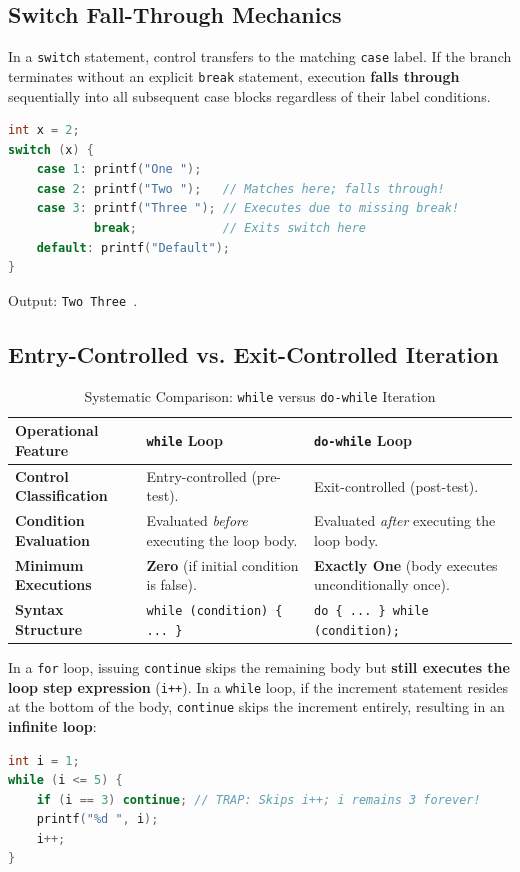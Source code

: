 \subsection{Switch Fall-Through Mechanics}
In a \texttt{switch} statement, control transfers to the matching \texttt{case} label. If the branch terminates without an explicit \texttt{break} statement, execution \textbf{falls through} sequentially into all subsequent case blocks regardless of their label conditions.

\begin{lstlisting}[language=C]
int x = 2;
switch (x) {
    case 1: printf("One ");
    case 2: printf("Two ");   // Matches here; falls through!
    case 3: printf("Three "); // Executes due to missing break!
            break;            // Exits switch here
    default: printf("Default");
}
\end{lstlisting}
Output: \texttt{Two Three }.

\subsection{Entry-Controlled vs. Exit-Controlled Iteration}
\begin{table}[htbp]
\centering
\small
\begin{tabularx}{\textwidth}{l X X}
\toprule
\textbf{Operational Feature} & \textbf{\texttt{while} Loop} & \textbf{\texttt{do-while} Loop} \\
\midrule
\textbf{Control Classification} & Entry-controlled (pre-test). & Exit-controlled (post-test). \\
\textbf{Condition Evaluation} & Evaluated \textit{before} executing the loop body. & Evaluated \textit{after} executing the loop body. \\
\textbf{Minimum Executions} & \textbf{Zero} (if initial condition is false). & \textbf{Exactly One} (body executes unconditionally once). \\
\textbf{Syntax Structure} & \texttt{while (condition) \{ ... \}} & \texttt{do \{ ... \} while (condition);} \\
\bottomrule
\end{tabularx}
\caption{Systematic Comparison: \texttt{while} versus \texttt{do-while} Iteration}
\label{tab:while_vs_dowhile}
\end{table}

\begin{tcolorbox}[colback=codebg,colframe=quotetext,title=\textbf{Exam Trap: The \texttt{continue} Statement in \texttt{while} vs. \texttt{for} Loops}]
In a \texttt{for} loop, issuing \texttt{continue} skips the remaining body but \textbf{still executes the loop step expression} (\texttt{i++}). In a \texttt{while} loop, if the increment statement resides at the bottom of the body, \texttt{continue} skips the increment entirely, resulting in an \textbf{infinite loop}:
\begin{lstlisting}[language=C]
int i = 1;
while (i <= 5) {
    if (i == 3) continue; // TRAP: Skips i++; i remains 3 forever!
    printf("%d ", i);
    i++;
}
\end{lstlisting}
\end{tcolorbox}

